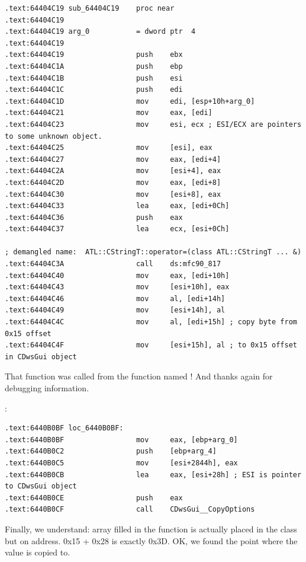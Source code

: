 \begin{lstlisting}
.text:64404C19 sub_64404C19    proc near
.text:64404C19
.text:64404C19 arg_0           = dword ptr  4
.text:64404C19
.text:64404C19                 push    ebx
.text:64404C1A                 push    ebp
.text:64404C1B                 push    esi
.text:64404C1C                 push    edi
.text:64404C1D                 mov     edi, [esp+10h+arg_0]
.text:64404C21                 mov     eax, [edi]
.text:64404C23                 mov     esi, ecx ; ESI/ECX are pointers to some unknown object.
.text:64404C25                 mov     [esi], eax
.text:64404C27                 mov     eax, [edi+4]
.text:64404C2A                 mov     [esi+4], eax
.text:64404C2D                 mov     eax, [edi+8]
.text:64404C30                 mov     [esi+8], eax
.text:64404C33                 lea     eax, [edi+0Ch]
.text:64404C36                 push    eax
.text:64404C37                 lea     ecx, [esi+0Ch]

; demangled name:  ATL::CStringT::operator=(class ATL::CStringT ... &)
.text:64404C3A                 call    ds:mfc90_817 
.text:64404C40                 mov     eax, [edi+10h]
.text:64404C43                 mov     [esi+10h], eax
.text:64404C46                 mov     al, [edi+14h]
.text:64404C49                 mov     [esi+14h], al
.text:64404C4C                 mov     al, [edi+15h] ; copy byte from 0x15 offset
.text:64404C4F                 mov     [esi+15h], al ; to 0x15 offset in CDwsGui object
\end{lstlisting}

{That function was called from the function named ! And thanks again for debugging information.}

 :

\begin{lstlisting}
.text:6440B0BF loc_6440B0BF:
.text:6440B0BF                 mov     eax, [ebp+arg_0]
.text:6440B0C2                 push    [ebp+arg_4]
.text:6440B0C5                 mov     [esi+2844h], eax
.text:6440B0CB                 lea     eax, [esi+28h] ; ESI is pointer to CDwsGui object
.text:6440B0CE                 push    eax
.text:6440B0CF                 call    CDwsGui__CopyOptions
\end{lstlisting}

{Finally, we understand: array filled in the  function is actually placed in the  class 
but on  address. 0x15 + 0x28 is exactly 0x3D. OK, we found the point where the value is copied to.}

